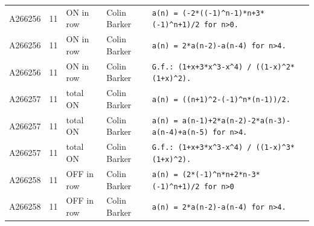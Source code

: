 \documentclass[11pt]{article}
\theoremstyle{definition}
\theoremstyle{remark}
\begin{document}
{\begin{longtable}{p{1.3cm}p{0.7cm}p{2.4cm}p{2.3cm}p{7.3cm}}
A266256 & 11 & ON in row & Colin Barker & \texttt{a(n)\allowbreak{} \allowbreak{}=\allowbreak{} \allowbreak{}(-\allowbreak{}2*\allowbreak{}((-\allowbreak{}1)\allowbreak{}\^{}n-\allowbreak{}1)\allowbreak{}*\allowbreak{}n+\allowbreak{}3*\allowbreak{}(-\allowbreak{}1)\allowbreak{}\^{}n+\allowbreak{}1)\allowbreak{}/\allowbreak{}2 \allowbreak{}for \allowbreak{}n>0.} \\
A266256 & 11 & ON in row & Colin Barker & \texttt{a(n)\allowbreak{} \allowbreak{}=\allowbreak{} \allowbreak{}2*\allowbreak{}a(n-\allowbreak{}2)\allowbreak{}-\allowbreak{}a(n-\allowbreak{}4)\allowbreak{} \allowbreak{}for \allowbreak{}n>4.} \\
A266256 & 11 & ON in row & Colin Barker & \texttt{G.f.: \allowbreak{}(1+\allowbreak{}x+\allowbreak{}3*\allowbreak{}x\^{}3-\allowbreak{}x\^{}4)\allowbreak{} \allowbreak{}/\allowbreak{} \allowbreak{}((1-\allowbreak{}x)\allowbreak{}\^{}2*\allowbreak{}(1+\allowbreak{}x)\allowbreak{}\^{}2)\allowbreak{}.} \\
A266257 & 11 & total ON & Colin Barker & \texttt{a(n)\allowbreak{} \allowbreak{}=\allowbreak{} \allowbreak{}((n+\allowbreak{}1)\allowbreak{}\^{}2-\allowbreak{}(-\allowbreak{}1)\allowbreak{}\^{}n*\allowbreak{}(n-\allowbreak{}1)\allowbreak{})\allowbreak{}/\allowbreak{}2.} \\
A266257 & 11 & total ON & Colin Barker & \texttt{a(n)\allowbreak{} \allowbreak{}=\allowbreak{} \allowbreak{}a(n-\allowbreak{}1)\allowbreak{}+\allowbreak{}2*\allowbreak{}a(n-\allowbreak{}2)\allowbreak{}-\allowbreak{}2*\allowbreak{}a(n-\allowbreak{}3)\allowbreak{}-\allowbreak{}a(n-\allowbreak{}4)\allowbreak{}+\allowbreak{}a(n-\allowbreak{}5)\allowbreak{} \allowbreak{}for \allowbreak{}n>4.} \\
A266257 & 11 & total ON & Colin Barker & \texttt{G.f.: \allowbreak{}(1+\allowbreak{}x+\allowbreak{}3*\allowbreak{}x\^{}3-\allowbreak{}x\^{}4)\allowbreak{} \allowbreak{}/\allowbreak{} \allowbreak{}((1-\allowbreak{}x)\allowbreak{}\^{}3*\allowbreak{}(1+\allowbreak{}x)\allowbreak{}\^{}2)\allowbreak{}.} \\
A266258 & 11 & OFF in row & Colin Barker & \texttt{a(n)\allowbreak{} \allowbreak{}=\allowbreak{} \allowbreak{}(2*\allowbreak{}(-\allowbreak{}1)\allowbreak{}\^{}n*\allowbreak{}n+\allowbreak{}2*\allowbreak{}n-\allowbreak{}3*\allowbreak{}(-\allowbreak{}1)\allowbreak{}\^{}n+\allowbreak{}1)\allowbreak{}/\allowbreak{}2 \allowbreak{}for \allowbreak{}n>0} \\
A266258 & 11 & OFF in row & Colin Barker & \texttt{a(n)\allowbreak{} \allowbreak{}=\allowbreak{} \allowbreak{}2*\allowbreak{}a(n-\allowbreak{}2)\allowbreak{}-\allowbreak{}a(n-\allowbreak{}4)\allowbreak{} \allowbreak{}for \allowbreak{}n>4.} \\

\end{longtable}}
\end{document}
